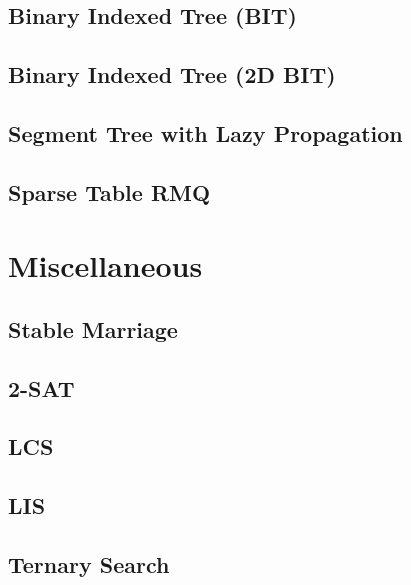\documentclass[12pt]{extarticle}
\begin{document}
\begin{multicols*}{2}
\subsection{Binary Indexed Tree (BIT)} %


\subsection{Binary Indexed Tree (2D BIT)} %


\subsection{Segment Tree with Lazy Propagation} %


\subsection{Sparse Table RMQ} %


\section{Miscellaneous}

\subsection{Stable Marriage} %


\subsection{2-SAT} %


\subsection{LCS} %


\subsection{LIS} %


\subsection{Ternary Search} %



\end{multicols*}
\end{document}
